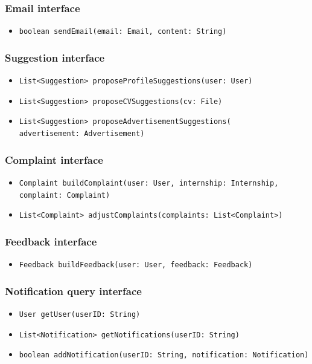 \subsubsection{Email interface}
\begin{itemize}
    \item \verb|boolean sendEmail(email: Email, content: String)|
\end{itemize}

\subsubsection{Suggestion interface}
\begin{itemize}
    \item \verb|List<Suggestion> proposeProfileSuggestions(user: User)|
    \item \verb|List<Suggestion> proposeCVSuggestions(cv: File)|
    \item \verb|List<Suggestion> proposeAdvertisementSuggestions(| \\ \makebox[10em][l]{} \verb|advertisement: Advertisement)|
\end{itemize}

\subsubsection{Complaint interface}
\begin{itemize}
    \item \verb|Complaint buildComplaint(user: User, internship: Internship, | \\ \makebox[10em][l]{} \verb|complaint: Complaint)|
    \item \verb|List<Complaint> adjustComplaints(complaints: List<Complaint>)|
\end{itemize}

\subsubsection{Feedback interface}
\begin{itemize}
    \item \verb|Feedback buildFeedback(user: User, feedback: Feedback)|
\end{itemize}

\subsubsection{Notification query interface}
\begin{itemize}
    \item \verb|User getUser(userID: String)|
    \item \verb|List<Notification> getNotifications(userID: String)|
    \item \verb|boolean addNotification(userID: String, notification: Notification)|
\end{itemize}

